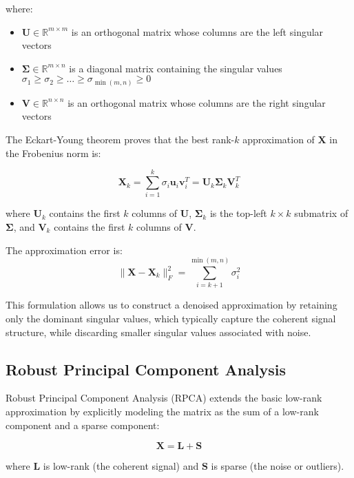 \documentclass[10pt,twocolumn]{article}
\begin{document}
where:
\begin{itemize}
\item $\mathbf{U} \in \mathbb{R}^{m \times m}$ is an orthogonal matrix whose columns are the left singular vectors
\item $\mathbf{\Sigma} \in \mathbb{R}^{m \times n}$ is a diagonal matrix containing the singular values $\sigma_1 \geq \sigma_2 \geq \ldots \geq \sigma_{\min(m,n)} \geq 0$
\item $\mathbf{V} \in \mathbb{R}^{n \times n}$ is an orthogonal matrix whose columns are the right singular vectors
\end{itemize}

The Eckart-Young theorem proves that the best rank-$k$ approximation of $\mathbf{X}$ in the Frobenius norm is:

\begin{equation}
\mathbf{X}_k = \sum_{i=1}^{k} \sigma_i \mathbf{u}_i \mathbf{v}_i^T = \mathbf{U}_k \mathbf{\Sigma}_k \mathbf{V}_k^T
\end{equation}

where $\mathbf{U}_k$ contains the first $k$ columns of $\mathbf{U}$, $\mathbf{\Sigma}_k$ is the top-left $k \times k$ submatrix of $\mathbf{\Sigma}$, and $\mathbf{V}_k$ contains the first $k$ columns of $\mathbf{V}$.

The approximation error is:
\begin{equation}
\|\mathbf{X} - \mathbf{X}_k\|_F^2 = \sum_{i=k+1}^{\min(m,n)} \sigma_i^2
\end{equation}

This formulation allows us to construct a denoised approximation by retaining only the dominant singular values, which typically capture the coherent signal structure, while discarding smaller singular values associated with noise.

\subsection{Robust Principal Component Analysis}
Robust Principal Component Analysis (RPCA) extends the basic low-rank approximation by explicitly modeling the matrix as the sum of a low-rank component and a sparse component:

\begin{equation}
\mathbf{X} = \mathbf{L} + \mathbf{S}
\end{equation}

where $\mathbf{L}$ is low-rank (the coherent signal) and $\mathbf{S}$ is sparse (the noise or outliers).
\end{document}

